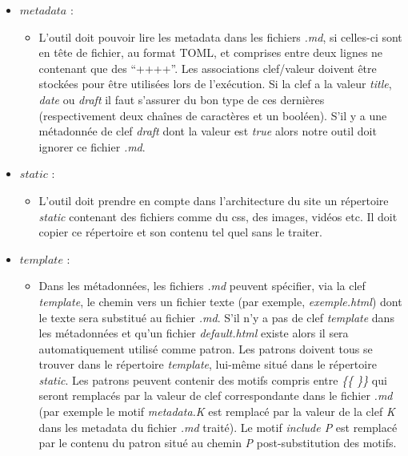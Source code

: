 \documentclass[a4paper, 11pt, openright, twoside]{article}
\begin{document}
\begin{itemize}[label=\-]
\item $metadata$ :
	\begin{itemize}[label=-]
		\item 
L’outil doit pouvoir lire les metadata dans les fichiers\emph{ .md}, si celles-ci sont en tête de fichier, au format TOML, et comprises entre deux lignes ne contenant que des “++++”. Les associations clef/valeur doivent être stockées pour être utilisées lors de l'exécution. Si la clef a la valeur \emph{title}, \emph{date} ou \emph{draft} il faut s'assurer du bon type de ces dernières (respectivement deux chaînes de caractères et un booléen). S'il y a une métadonnée de clef \emph{draft} dont la valeur est \emph{true} alors notre outil doit ignorer ce fichier \emph{.md}.
	\end{itemize}

\item $static$ :
	\begin{itemize}[label=-]
		\item 
L’outil doit prendre en compte dans l'architecture du site un répertoire \emph{static} contenant des fichiers comme du css, des images, vidéos etc. Il doit copier ce répertoire et son contenu tel quel sans le traiter.
	\end{itemize}

\item $template$ :
	\begin{itemize}[label=-]
		\item 
Dans les métadonnées, les fichiers \emph{.md} peuvent spécifier, via la clef \emph{template}, le chemin vers un fichier texte (par exemple, \emph{exemple.html}) dont le texte sera substitué au fichier \emph{.md}. S'il n'y a pas de clef \emph{template} dans les métadonnées et qu'un fichier \emph{default.html} existe alors il sera automatiquement utilisé comme patron. Les patrons doivent tous se trouver dans le répertoire \emph{template}, lui-même situé dans le répertoire \emph{static}. Les patrons peuvent contenir des motifs compris entre \emph{\{\{ \}\}} qui seront remplacés par la valeur de clef correspondante dans le fichier \emph{.md} (par exemple le motif \emph{metadata.K} est remplacé par la valeur de la clef \emph{K} dans les metadata du fichier \emph{.md} traité). Le motif \emph{include P} est remplacé par le contenu du patron situé au chemin \emph{P} post-substitution des motifs.
\end{itemize}
\end{itemize}
\end{document}
